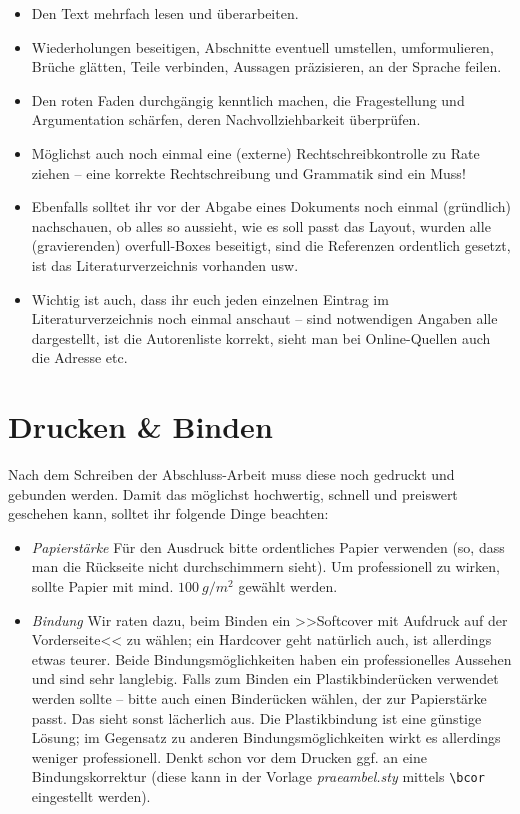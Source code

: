 \begin{itemize}
\item Den Text mehrfach lesen und überarbeiten.
\item Wiederholungen beseitigen, Abschnitte eventuell umstellen, umformulieren, Brüche glätten, Teile verbinden, Aussagen präzisieren, an der Sprache feilen.
\item Den roten Faden durchgängig kenntlich machen, die Fragestellung und Argumentation schärfen, deren Nachvollziehbarkeit überprüfen.
\item Möglichst auch noch einmal eine (externe) Rechtschreibkontrolle zu Rate ziehen -- eine korrekte Rechtschreibung und Grammatik sind ein Muss!
\item Ebenfalls solltet ihr vor der Abgabe eines Dokuments noch einmal (gründlich) nachschauen, ob alles so aussieht, wie es soll passt das Layout, wurden alle (gravierenden) overfull-Boxes beseitigt, sind die Referenzen ordentlich gesetzt, ist das Literaturverzeichnis vorhanden usw.
\item Wichtig ist auch, dass ihr euch jeden einzelnen Eintrag im Literaturverzeichnis noch einmal anschaut -- sind notwendigen Angaben alle dargestellt, ist die Autorenliste korrekt, sieht man bei Online-Quellen auch die Adresse etc.
\end{itemize}

\section{Drucken \& Binden}

Nach dem Schreiben der Abschluss-Arbeit muss diese noch gedruckt und gebunden werden. Damit das möglichst hochwertig, schnell und preiswert geschehen kann, solltet ihr folgende Dinge beachten:

\begin{itemize}
\item \emph{Papierstärke} Für den Ausdruck bitte ordentliches Papier verwenden (so, dass man die Rückseite nicht durchschimmern sieht). Um professionell zu wirken, sollte Papier mit mind. $100~g/m^2$ gewählt werden.
\item \emph{Bindung} Wir raten dazu, beim Binden ein >>Softcover mit Aufdruck auf der Vorderseite<< zu wählen; ein Hardcover geht natürlich auch, ist allerdings etwas teurer. Beide Bindungsmöglichkeiten haben ein professionelles Aussehen und sind sehr langlebig. Falls zum Binden ein Plastikbinderücken verwendet werden sollte -- bitte auch einen Binderücken wählen, der zur Papierstärke passt. Das sieht sonst lächerlich aus. Die Plastikbindung ist eine günstige Lösung; im Gegensatz zu anderen Bindungsmöglichkeiten wirkt es allerdings weniger professionell. Denkt schon vor dem Drucken ggf. an eine Bindungskorrektur (diese kann in der Vorlage \emph{praeambel.sty} mittels \verb|\bcor| eingestellt werden).
\end{itemize}
